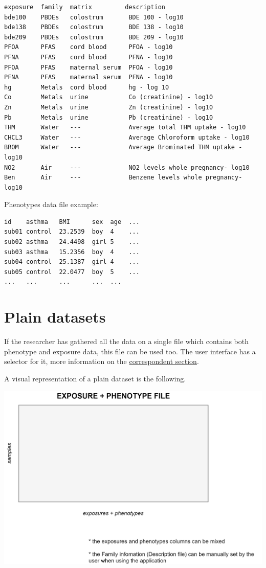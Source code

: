 \documentclass[
]{book}
\begin{document}
\begin{verbatim}
exposure  family  matrix         description
bde100    PBDEs   colostrum       BDE 100 - log10
bde138    PBDEs   colostrum       BDE 138 - log10
bde209    PBDEs   colostrum       BDE 209 - log10
PFOA      PFAS    cord blood      PFOA - log10
PFNA      PFAS    cord blood      PFNA - log10
PFOA      PFAS    maternal serum  PFOA - log10
PFNA      PFAS    maternal serum  PFNA - log10
hg        Metals  cord blood      hg - log 10
Co        Metals  urine           Co (creatinine) - log10
Zn        Metals  urine           Zn (creatinine) - log10
Pb        Metals  urine           Pb (creatinine) - log10
THM       Water   ---             Average total THM uptake - log10
CHCL3     Water   ---             Average Chloroform uptake - log10
BROM      Water   ---             Average Brominated THM uptake - log10
NO2       Air     ---             NO2 levels whole pregnancy- log10
Ben       Air     ---             Benzene levels whole pregnancy- log10
\end{verbatim}

Phenotypes data file example:

\begin{verbatim}
id    asthma   BMI      sex  age  ...
sub01 control  23.2539  boy  4    ...
sub02 asthma   24.4498  girl 5    ...
sub03 asthma   15.2356  boy  4    ...
sub04 control  25.1387  girl 4    ...
sub05 control  22.0477  boy  5    ...
...   ...      ...      ...  ...
\end{verbatim}

\hypertarget{plain_data_expl}{%
\section{Plain datasets}\label{plain_data_expl}}

If the researcher has gathered all the data on a single file which contains both phenotype and exposure data, this file can be used too. The user interface has a selector for it, more information on the \protect\hyperlink{plain_data}{correspondent section}.

A visual representation of a plain dataset is the following.

\includegraphics{images/plain_tables.png}
\end{document}
